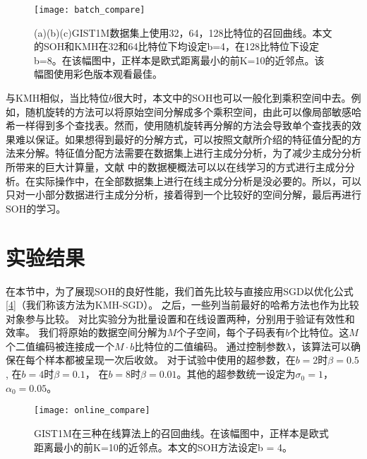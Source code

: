 \begin{figure}[ht]
	\begin{center}
		\texttt{[image: batch\_compare]}
		\caption{(a)(b)(c)GIST1M数据集上使用32，64，128比特位的召回曲线。本文的SOH和KMH在32和64比特位下均设定b=4，在128比特位下设定b=8。在该幅图中，正样本是欧式距离最小的前K=10的近邻点。该幅图使用彩色版本观看最佳。  }
		\label{batch_compare}
	\end{center}
\end{figure}
与KMH相似，当比特位$b$很大时，本文中的SOH也可以一般化到乘积空间中去。例如，随机旋转的方法可以将原始空间分解成多个乘积空间，由此可以像局部敏感哈希一样得到多个查找表。然而，使用随机旋转再分解的方法会导致单个查找表的效果难以保证。如果想得到最好的分解方式，可以按照文献\cite{ge2014optimized}所介绍的特征值分配的方法来分解。特征值分配方法需要在数据集上进行主成分分析，为了减少主成分分析所带来的巨大计算量，文献\cite{leng2015online} 中的数据梗概法可以以在线学习的方式进行主成分分析。在实际操作中，在全部数据集上进行在线主成分分析是没必要的。所以，可以只对一小部分数据进行主成分分析，接着得到一个比较好的空间分解，最后再进行SOH的学习。

\section{实验结果}
在本节中，为了展现SOH的良好性能，我们首先比较与直接应用SGD以优化公式\ref{4}（我们称该方法为KMH-SGD）。 之后，一些列当前最好的哈希方法也作为比较对象参与比较。 对比实验分为批量设置和在线设置两种，分别用于验证有效性和效率。 我们将原始的数据空间分解为$M$个子空间，每个子码表有$b$个比特位。这$M$个二值编码被连接成一个$ M\cdot b$比特位的二值编码。 通过控制参数$\lambda $，该算法可以确保在每个样本都被呈现一次后收敛。
对于试验中使用的超参数，在$b=2$时$\beta = 0.5$,  在$b=4$时$\beta = 0.1$， 在$b=8$时$\beta = 0.01$。其他的超参数统一设定为$\sigma_{0} = 1$， $\alpha_{0} = 0.05$。
\begin{figure}[t]
	\begin{center}
		\texttt{[image: online\_compare]}
		\caption{GIST1M在三种在线算法上的召回曲线。在该幅图中，正样本是欧式距离最小的前K=10的近邻点。本文的SOH方法设定b = 4。 }
		\label{somkmeans}
	\end{center}
\end{figure}
